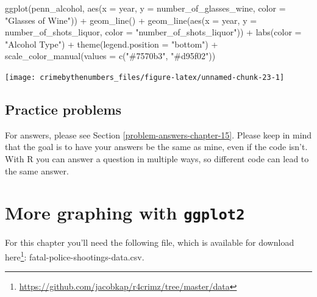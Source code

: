 \documentclass[
]{krantz}
\makeatletter
\newenvironment{Shaded}{\begin{snugshade}}{\end{snugshade}}
\newcommand{\AttributeTok}[1]{\textcolor[rgb]{0.61,0.61,0.61}{#1}}
\newcommand{\FunctionTok}[1]{\textcolor[rgb]{0,0,0}{#1}}
\newcommand{\NormalTok}[1]{#1}
\newcommand{\SpecialCharTok}[1]{\textcolor[rgb]{0,0,0}{#1}}
\newcommand{\StringTok}[1]{\textcolor[rgb]{0.5,0.5,0.5}{#1}}
\renewcommand{\href}[2]{#2\footnote{\url{#1}}}
\newenvironment{kframe}{%
\medskip{}
\setlength{\fboxsep}{.8em}
 \def\at@end@of@kframe{}%
 \ifinner\ifhmode%
  \def\at@end@of@kframe{\end{minipage}}%
  \begin{minipage}{\columnwidth}%
 \fi\fi%
 \def\FrameCommand##1{\hskip\@totalleftmargin \hskip-\fboxsep
 \colorbox{shadecolor}{##1}\hskip-\fboxsep
     \hskip-\linewidth \hskip-\@totalleftmargin \hskip\columnwidth}%
 \MakeFramed {\advance\hsize-\width
   \@totalleftmargin\z@ \linewidth\hsize
   \@setminipage}}%
 {\par\unskip\endMakeFramed%
 \at@end@of@kframe}
\renewenvironment{Shaded}{\begin{kframe}}{\end{kframe}}
\makeatother
\begin{document}
\begin{Shaded}
\begin{Highlighting}[]
\FunctionTok{ggplot}\NormalTok{(penn\_alcohol, }\FunctionTok{aes}\NormalTok{(}\AttributeTok{x =}\NormalTok{ year, }\AttributeTok{y =}\NormalTok{ number\_of\_glasses\_wine,}
                         \AttributeTok{color =} \StringTok{"Glasses of Wine"}\NormalTok{)) }\SpecialCharTok{+}
  \FunctionTok{geom\_line}\NormalTok{() }\SpecialCharTok{+}
  \FunctionTok{geom\_line}\NormalTok{(}\FunctionTok{aes}\NormalTok{(}\AttributeTok{x =}\NormalTok{ year, }\AttributeTok{y =}\NormalTok{ number\_of\_shots\_liquor,}
                \AttributeTok{color =} \StringTok{"number\_of\_shots\_liquor"}\NormalTok{)) }\SpecialCharTok{+}
  \FunctionTok{labs}\NormalTok{(}\AttributeTok{color =} \StringTok{"Alcohol Type"}\NormalTok{) }\SpecialCharTok{+}
  \FunctionTok{theme}\NormalTok{(}\AttributeTok{legend.position =} \StringTok{"bottom"}\NormalTok{) }\SpecialCharTok{+}
  \FunctionTok{scale\_color\_manual}\NormalTok{(}\AttributeTok{values =} \FunctionTok{c}\NormalTok{(}\StringTok{"\#7570b3"}\NormalTok{, }\StringTok{"\#d95f02"}\NormalTok{))}
\end{Highlighting}
\end{Shaded}

\begin{center}\texttt{[image: crimebythenumbers\_files/figure-latex/unnamed-chunk-23-1]} \end{center}

\hypertarget{practice-problems-8}{%
\section{Practice problems}\label{practice-problems-8}}

For answers, please see Section \ref{problem-answers-chapter-15}. Please keep in mind that the goal is to have your answers be the same as mine, even if the code isn't. With R you can answer a question in multiple ways, so different code can lead to the same answer.

\hypertarget{ois-graphs}{%
\chapter{\texorpdfstring{More graphing with \texttt{ggplot2}}{More graphing with ggplot2}}\label{ois-graphs}}

For this chapter you'll need the following file, which is available for download \href{https://github.com/jacobkap/r4crimz/tree/master/data}{here}: fatal-police-shootings-data.csv.
\end{document}
